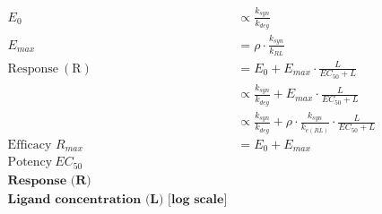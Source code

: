 \documentclass{standalone}
\begin{document}
\begin{math}
\begin{aligned}
	E_{0} &\propto \frac{k_{syn}}{k_{deg}} \\
	E_{max} &= \rho \cdot \frac{k_{syn}}{k_{RL}} \\
	\mathrm{Response\ (R)} &= E_{0} + E_{max} \cdot \frac{L}{EC_{50} + L} \\
		&\propto \frac{k_{syn}}{k_{deg}} + E_{max} \cdot \frac{L}{EC_{50} + L} \\
		&\propto \frac{k_{syn}}{k_{deg}} + \rho \cdot \frac{k_{syn}}{k_{e(RL)}} \cdot \frac{L}{EC_{50} + L} \\
	\text{Efficacy } R_{max} &= E_{0} + E_{max} \\
	\text{Potency}\ EC_{50} \\
	\textbf{Response (R)} \\
	\textbf{Ligand concentration (L) [log scale]}
\end{aligned}
\end{math}
\end{document}

